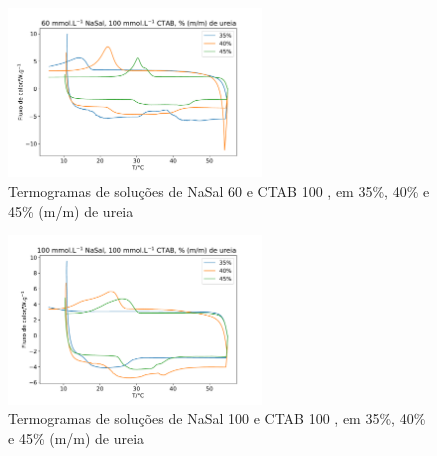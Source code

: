 %		
%	
%	
	
		\begin{figure}[H]
			\centering
			\includegraphics[width=0.60\textwidth]{./imagens/dsc/NaSal60}
			\caption{Termogramas de soluções de NaSal 60\mM{} e CTAB 100 \mM{}, em 35\%, 40\% e 45\% (m/m) de ureia}
			\label{fig:DSC_NaSal60}
		\end{figure}
	
		\begin{figure}[H]
			\centering
			\includegraphics[width=0.60\textwidth]{./imagens/dsc/NaSal100}
			\caption{Termogramas de soluções de NaSal 100\mM{} e CTAB 100 \mM{}, em 35\%, 40\% e 45\% (m/m) de ureia}
			\label{fig:DSC_NaSal100}
		\end{figure}

